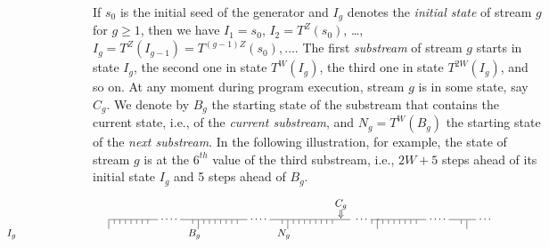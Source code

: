 \documentclass[12pt]{article}
\newif\iflong\longfalse
\begin{document}
If $s_0$ is the initial seed of the generator and $I_{g}$ denotes the
{\em initial state\/} of stream $g$ for $g\ge 1$, then we have
$I_1 = s_0$, $I_2 = T^Z(s_0)$, \dots, $I_g = T^Z(I_{g-1}) = T^{(g-1)Z}(s_0),
\dots$.
The first {\em substream\/} of stream $g$ starts in state $I_g$,
the second one in state $T^W(I_g)$, the third one in state $T^{2W}(I_g)$,
and so on.
At any moment during program execution, stream $g$ is in some state, say
$C_{g}$.  We denote by $B_g$ the starting state of the substream that
contains the current state, i.e., of the {\em current substream},
and $N_g = T^W(B_g)$ the starting state of the {\em next substream\/}.
In the following illustration, for example, the state of stream $g$ is at
the $6^{th}$ value of the third substream, i.e., $2W+5$ steps
ahead of its initial state $I_g$ and 5 steps ahead of $B_g$.
\iflong %
Figure~\ref{streams} depicts the overall
arrangement of the streams and substreams, and indicates the
spacings and number of each.
\fi %
\begin{center}
\def\tick#1{\vrule height 0pt depth #1pt}
\def\enskip{\hskip.5em\relax}
\def\ld{\hbox to 0.24 in{\vtop{\kern3.0pt\hbox{\dotfill}}}}
\def\ts{\enskip\tick4}
\def\suba{\hbox to 1.2in {\vtop
 {\hbox to 1.2in{\hbox to .66in{\hrulefill}\hbox to .30in{\dotfill}\hrulefill}
  \hbox to 1.2in{\tick9\ts\ts\ts\ts\ts\ts\ts\hfill\ts\enskip}}}}
\def\subb{\hbox to 1.2in {\vtop
 {\hbox to 1.2in{\hbox to .84in {\hrulefill}
         \hbox to .24in {\dotfill}\hbox to .12in {\hrulefill}}
  \hbox to 1.2in{\tick9\ts\ts\ts\ts\ts\ts\ts\ts\hfill\ts\enskip}}}}

$$\vbox{\offinterlineskip \hbox to 6.0in{\hskip 2.65in \hbox to
1.2in{\hfil\hskip1.07em $C_g$\hfil}\hfill} \vskip .1pt \hbox to
6.0in{\hskip 2.65in \hbox to 1.2in{\hfil\hskip1.07em
$\Downarrow$\hfil}
    \hfill}
\vtop {\offinterlineskip\hskip 0.0in \hbox to 5.5 true in
       {\suba\suba\subb\suba\tick9
        \hbox to .12in {\hrulefill}\hbox to .24in{\dotfill}}}\vskip .1pt
\hskip -1.90in\hbox to 1.2 in{\hfil$I_g$\hfil}\hskip 1.25in
  \hbox to 1.2 in{\hfil$B_g$\hfil}\hbox to 1.2 in{\hfil$N_g$\hfil}\hfill
\vskip .1pt } $$
\end{center}
\end{document}
